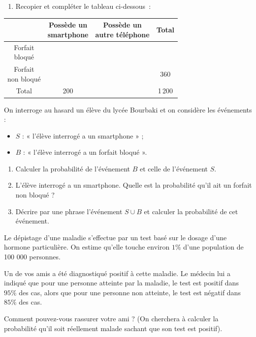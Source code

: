 \documentclass[a4paper,11pt]{article}
\begin{document}
\begin{multicols}{2}
\begin{exercice}[title=Exercice 12 $\star\star$ { [Modéliser, Calculer] }]{}{}
  \begin{enumerate}
    \item Recopier et compléter le tableau ci-dessous~:
  \end{enumerate}
      \begin{center}
      \small
      \renewcommand{\arraystretch}{1.2}
      \begin{tabular}{|c|c|c|c|}
      \hline
       & \makecell{Possède un\\smartphone} & \makecell{Possède un\\autre téléphone} & Total \\ \hline
      \makecell{Forfait \\bloqué} & & & \\ \hline
      \makecell{Forfait \\non bloqué} & & & 360 \\ \hline
      Total & 200 & & 1\,200 \\ \hline
      \end{tabular}
      \end{center}

  On interroge au hasard un élève du lycée Bourbaki et on considère les événements :
  \begin{itemize}[label=$\bullet$]
    \item $S$ : « l'élève interrogé a un smartphone » ;
    \item $B$ : « l'élève interrogé a un forfait bloqué ».
  \end{itemize}

  \begin{enumerate}[resume]
    \item Calculer la probabilité de l'événement $B$ et celle de l'événement $S$.
    \item L'élève interrogé a un smartphone. Quelle est la probabilité qu'il ait un forfait non bloqué ?
    \item Décrire par une phrase l'événement $S \cup B$ et calculer la probabilité de cet événement.
  \end{enumerate}
\end{exercice}



\begin{exercice}[title=Exercice 13 $\star\star\star$ { [Modéliser, Calculer, Communiquer] }]{}{}
  Le dépistage d'une maladie s'effectue par un test basé sur le dosage d'une hormone particulière. On estime qu'elle touche environ \(1\%\) d'une population de 100 000 personnes.

  Un de vos amis a été diagnostiqué positif à cette maladie. Le médecin lui a indiqué que pour une personne atteinte par la maladie, le test est positif dans \(95\%\) des cas, alors que pour une personne non atteinte, le test est négatif dans \(85\%\) des cas.

  Comment pouvez-vous rassurer votre ami ? (On cherchera à calculer la probabilité qu'il soit réellement malade sachant que son test est positif).
\end{exercice}


\null\vfill

\end{multicols}
\end{document}
